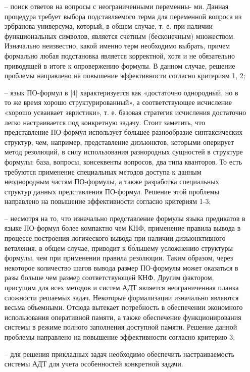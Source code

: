     \begin{itemize}
				\item[--] поиск ответов на вопросы с неограниченными переменны- ми. Данная процедура требует выбора подставляемого терма для переменной вопроса из эрбранова универсума, который, в общем случае, т. е. при наличии функциональных символов, является счетным (бесконечным) множеством. Изначально неизвестно, какой именно терм необходимо выбрать, причем формально любая подстановка является корректной, хотя и не обязательно приводящей в итоге к опровержению формулы. В данном случае, решение проблемы направлено на повышение эффективности согласно критериям 1, 2;
				\item[--] язык ПО-формул в [4] характеризуется как «достаточно однородный, но в то же время хорошо структурированный», а соответствующее исчисление «хорошо усваивает эвристики», т. е. базовая стратегия исчисления достаточно легко настраивается под конкретную задачу. Стоит заметить, что представление ПО-формул использует большее разнообразие синтаксических структур, чем, например, представление дизъюнктов, которыми оперирует метод резолюций, в силу использования разнородных сущностей в структуре формулы: база, вопросы, консеквенты вопросов, два типа кванторов. То есть требуются применение специальных методов доступа к данным неоднородным частям ПО-формулы, а также разработка специальных структур данных представления ПО-формул. Решение этой проблемы направлено на повышение эффективности согласно критериям 1-3;
				\item[--] несмотря на то, что изначально представление формулы языка предикатов в языке ПО-формул более компактно чем КНФ, применение правила вывода в процессе построения логического вывода при наличии дизъюнктивного ветвления, в общем случае, приводит к бо́льшему усложнению структуры формулы, чем при применении правила резолюции. Таким образом, через некоторое количество шагов вывода размер ПО-формулы может оказаться в разы больше чем размер соответствующей КНФ. Другим фактором, присущим для всех методов и систем АДТ является неограниченная планка сложности решаемых задач. Некоторые формализации изначально являются весьма объемными. Отсюда вытекает потребность в обеспечении экономного использования оперативной памяти, а также обеспечение функционирования системы в режиме полного заполнения доступной памяти. Решение данной проблемы направлено на повышение эффективности согласно критерию 3;
				\item[--] для решения прикладных задач необходимо обеспечить настраиваемость системы АДТ для учета особенностей конкретной задачи.
    \end{itemize}

